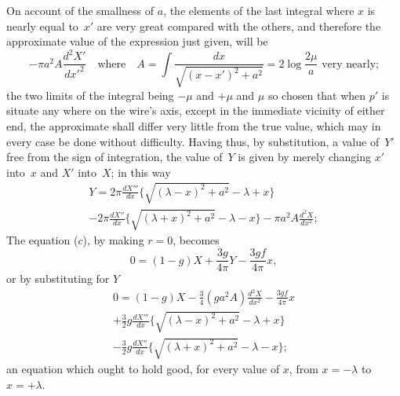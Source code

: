 \documentclass[11pt,notitlepage]{amsart}
\begin{document}
On account of the smallness of $a$, the elements of the last integral
where $x$ is nearly equal to~$x'$ are very great compared with the others, and
therefore the approximate value of the expression just given, will be
\[
-\pi a^2A\frac{d^2X'}{dx'^2}
\quad\text{where}\quad
A=\int\frac{dx}{\sqrt{(x-x')^2+a^2}}=2\log\frac{2\mu}{a}
\text{\ very nearly;}
\]
the two limits of the integral being $-\mu$ and $+\mu$ and $\mu$ so chosen that
when $p'$ is situate any where on the wire's axis, except in the immediate
vicinity of either end, the approximate shall differ very little from the true
value, which may in every case be done without difficulty. Having thus, by
substitution, a value of~$Y'$ free from the sign of integration,
the value of~$Y$
is given by merely changing $x'$ into~$x$ and $X'$ into~$X$; in this way
\begin{multline*}
Y=
2\pi\frac{dX'''}{dx}
\biggl\{\sqrt{(\lambda-x)^2+a^2}-\lambda+x\biggr\}\\
-2\pi\frac{dX''}{dx}
\biggl\{\sqrt{(\lambda+x)^2+a^2}-\lambda-x\biggr\}
-\pi a^2A\frac{d^2X}{dx^2};
\end{multline*}
The equation ($c$), by making $r=0$, becomes
\[
0=(1-g)X+\frac{3g}{4\pi}Y-\frac{3gf}{4\pi}x,
\]
or by substituting for $Y$
\begin{multline*}
0=(1-g)X-\tfrac34(ga^2A)\frac{d^2X}{dx^2}-\frac{3gf}{4\pi}x\\
+\tfrac32g\frac{dX'''}{dx}
\biggl\{\sqrt{(\lambda-x)^2+a^2}-\lambda+x\biggr\}\\
-\tfrac32g\frac{dX''}{dx}
\biggl\{\sqrt{(\lambda+x)^2+a^2}-\lambda-x\biggr\};
\end{multline*}
an equation which ought to hold good, for every value of $x$, from 
$x=-\lambda$ to $x=+\lambda$.
\end{document}
